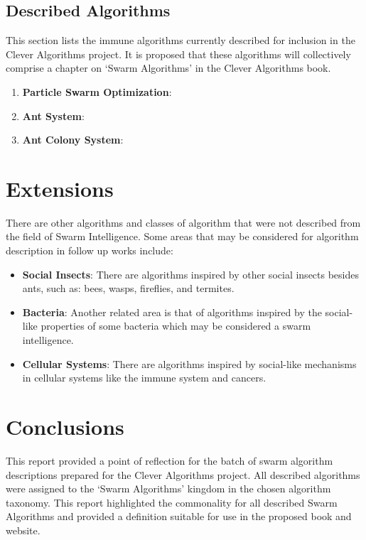 \documentclass[a4paper, 11pt]{article}
\begin{document}
% 
% 
\subsection{Described Algorithms}
\label{subsec:algorithms}
This section lists the immune algorithms currently described for inclusion in the Clever Algorithms project. It is proposed that these algorithms will collectively comprise a chapter on `Swarm Algorithms' in the Clever Algorithms book. 

\begin{enumerate}
	\item \textbf{Particle Swarm Optimization}: \cite{Brownlee2010ac}
	\item \textbf{Ant System}: \cite{Brownlee2010ad}
	\item \textbf{Ant Colony System}: \cite{Brownlee2010ae}
\end{enumerate}

% 
% 
\section{Extensions}
\label{sec:extensions}
There are other algorithms and classes of algorithm that were not described from the field of Swarm Intelligence. Some areas that may be considered for algorithm description in follow up works include:

\begin{itemize}
	\item \textbf{Social Insects}: There are algorithms inspired by other social insects besides ants, such as: bees, wasps, fireflies, and termites. 
	\item \textbf{Bacteria}: Another related area is that of algorithms inspired by the social-like properties of some bacteria which may be considered a swarm intelligence.
	\item \textbf{Cellular Systems}: There are algorithms inspired by social-like mechanisms in cellular systems like the immune system and cancers.  
\end{itemize}

% 
% 
\section{Conclusions}
\label{sec:conclusions}
This report provided a point of reflection for the batch of swarm algorithm descriptions prepared for the Clever Algorithms project. All described algorithms were assigned to the `Swarm Algorithms' kingdom in the chosen algorithm taxonomy. This report highlighted the commonality for all described Swarm Algorithms and provided a definition suitable for use in the proposed book and website.



\end{document}
